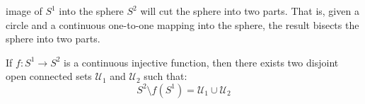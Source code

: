 \documentclass[crop=false,class=book,oneside]{standalone}
\begin{document}
            image of $S^{1}$ into the sphere $S^{2}$ will cut the
            sphere into two parts. That is, given a circle and
            a continuous one-to-one mapping into the sphere, the
            result bisects the sphere into two parts.
            \begin{theorem}
                \label{theorem:Surgery_Theory_Sphere_Without_Circle_Is_Disconnected}
                If $f:S^{1}\rightarrow{S}^{2}$ is a continuous injective
                function, then there exists two disjoint open connected
                sets $\mathcal{U}_{1}$ and $\mathcal{U}_{2}$ such that:
                \begin{equation}
                    S^{2}\setminus{f}(S^{1})
                    =\mathcal{U}_{1}\cup\mathcal{U}_{2}
                \end{equation}
            \end{theorem}
\end{document}

